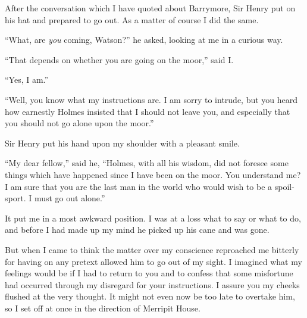 \documentclass[paper=5.5in:8.5in,BCOR=7mm,twoside,DIV=calc,12pt,usegeometry,openany,chapterprefix,endperiod,headings=big]{scrbook} %
\begin{document}
After the conversation which I have quoted about Barrymore, Sir Henry put on his hat and prepared to go out. As a matter of course I did the same.

\enquote{What, are \emph{you} coming, Watson?} he asked, looking at me in a curious way.

\enquote{That depends on whether you are going on the moor,} said I.

\enquote{Yes, I am.}

\enquote{Well, you know what my instructions are. I am sorry to intrude, but you heard how earnestly Holmes insisted that I should not leave you, and especially that you should not go alone upon the moor.}

Sir Henry put his hand upon my shoulder with a pleasant smile.

\enquote{My dear fellow,} said he, \enquote{Holmes, with all his wisdom, did not foresee some things which have happened since I have been on the moor. You understand me? I am sure that you are the last man in the world who would wish to be a spoil-sport. I must go out alone.}

It put me in a most awkward position. I was at a loss what to say or what to do, and before I had made up my mind he picked up his cane and was gone.

But when I came to think the matter over my conscience reproached me bitterly for having on any pretext allowed him to go out of my sight. I imagined what my feelings would be if I had to return to you and to confess that some misfortune had occurred through my disregard for your instructions. I assure you my cheeks flushed at the very thought. It might not even now be too late to overtake him, so I set off at once in the direction of Merripit House.

\end{document}
